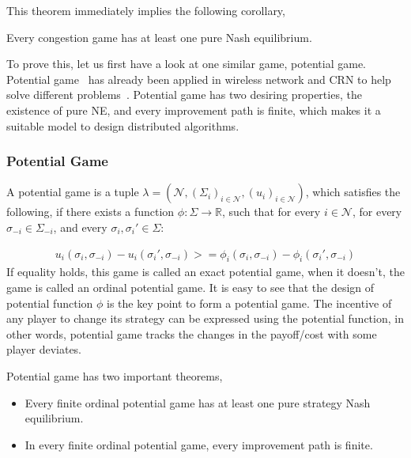 This theorem immediately implies the following corollary,
\begin{corollary}
\label{background:corollary}
Every congestion game has at least one pure Nash equilibrium.~\cite{Rosenthal}
\end{corollary}

To prove this, let us first have a look at one similar game, potential game.
Potential game~\cite{Mondere_potential_game:1996} has already been applied in wireless network and CRN to help solve different problems~\cite{CApotentialLearning_05dyspan, caps_potential2012, self-coexistenceWRAN2010infocom, pimrc_2012}.
Potential game has two desiring properties, the existence of pure NE, and every improvement path is finite, which makes it a suitable model to design distributed algorithms.


\subsubsection*{Potential Game}

A potential game is a tuple $\lambda=(\mathcal{N},(\Sigma_i)_{i \in \mathcal{N}},(u_i)_{i\in \mathcal{N}})$, which satisfies the following, if there exists a function $\phi: \Sigma\rightarrow \mathbb{R}$, such that for every $i\in \mathcal{N}$, for every $\sigma_{-i}\in \Sigma_{-i}$, and every $\sigma_i, \sigma_i'\in \Sigma$:

\begin{equation}
\label{2:1}
\begin{split}
u_i(\sigma_i, \sigma_{-i})-u_i(\sigma_i', \sigma_{-i}) >= \phi_i(\sigma_i, \sigma_{-i})-\phi_i(\sigma_i', \sigma_{-i})
\end{split}
\end{equation}
If equality holds, this game is called an exact potential game, when it doesn't, the game is called an ordinal potential game.
It is easy to see that the design of potential function $\phi$ is the key point to form a potential game. 
The incentive of any player to change its strategy can be expressed using the potential function, in other words, potential game tracks the changes in the payoff/cost with some player deviates.


Potential game has two important theorems,
\begin{itemize}
\item Every finite ordinal potential game has at least one pure strategy Nash equilibrium.
\item In every finite ordinal potential game, every improvement path is finite.

\end{itemize}

